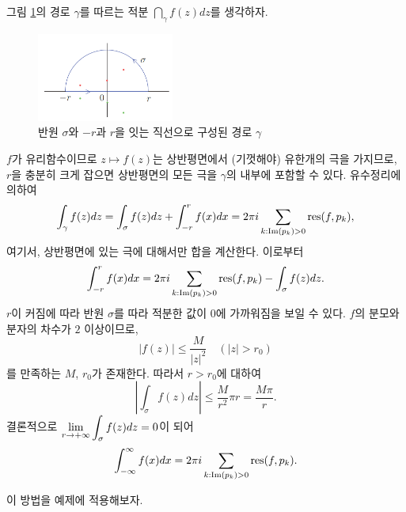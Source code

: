 그림 \ref{fig-4-4}의 경로 $\gamma$를 따르는 적분
$\dint_\gamma f(z)dz$를 생각하자.

\begin{figure}[h!]
\begin{center}
\includegraphics[width=0.4\textwidth]{./SaltChapter/figs/fig-4-4}
\end{center}
\caption{반원 $\sigma$와 $-r$과 $r$을 잇는 직선으로 구성된 경로 $\gamma$}
\label{fig-4-4}
\end{figure}

$f$가 유리함수이므로 $z\mapsto f(z)$는 상반평면에서 (기껏해야) 유한개의 극을 가지므로,
$r$을  충분히 크게 잡으면 상반평면의 모든 극을 $\gamma$의 내부에 포함할 수 있다.
유수정리에 의하여
\[
\int_\gamma f(z)dz = \int_\sigma f(z)dz + \int_{-r}^r f(x)dx
= 2\pi i \sum\limits_{k: \Im(p_k)>0} \mathop{\mathrm{res}}(f,p_k),
\]
여기서, 상반평면에 있는 극에 대해서만 합을 계산한다.
이로부터
\[
\int_{-r}^r f(x)dx = 2\pi i \sum\limits_{k: \Im(p_k)>0} \mathop{\mathrm{res}}(f,p_k)
- \int_\sigma f(z)dz.
\]
$r$이 커짐에 따라 반원 $\sigma$를 따라 적분한 값이 $0$에 가까워짐을 보일 수 있다.
$f$의 분모와 분자의 차수가 $2$ 이상이므로, 
\[
|f(z)| \le \dfrac M{|z|^2} \quad (|z|>r_0)
\]
를 만족하는 $M$, $r_0$가 존재한다.
따라서 $r>r_0$에 대하여
\[
\left| \int_\sigma f(z)dz \right| \le \dfrac  M{r^2} \pi r = \dfrac {M\pi}r.
\]
결론적으로
$\lim\limits_{r\to+\infty} \displaystyle\int_\sigma f(z)dz = 0$이 되어
\[
\int_{-\infty}^\infty f(x)dx
= 2\pi i \sum\limits_{k: \Im(p_k)>0} \mathop{\mathrm{res}}(f,p_k).
\]

이 방법을 예제에 적용해보자.


